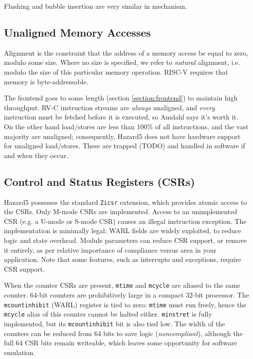 Flushing and bubble insertion are very similar in mechanism.

\subsection{Unaligned Memory Accesses}

Alignment is the constraint that the address of a memory access be equal to zero, modulo some size. Where no size is specified, we refer to {\it natural} alignment, i.e. modulo the size of this particular memory operation. RISC-V requires that memory is byte-addressable.

The frontend goes to some length (section \ref{section:frontend}) to maintain high throughput. RV-C instruction streams are {\it always} unaligned, and {\it every} instruction must be fetched before it is executed, so Amdahl says it's worth it. On the other hand load/stores are less than 100\% of all instructions, and the vast majority are unaligned; consequently, Hazard5 does not have hardware support for unaligned load/stores. These are trapped (TODO) and handled in software if and when they occur.

\subsection{Control and Status Registers (CSRs)}

Hazard5 possesses the standard {\tt Zicsr} extension, which provides atomic access to the CSRs. Only M-mode CSRs are implemented. Access to an unimplemented CSR (e.g. a U-mode or S-mode CSR) causes an illegal instruction exception. The implementation is minimally legal: WARL fields are widely exploited, to reduce logic and state overhead. Module parameters can reduce CSR support, or remove it entirely, as per relative importance of compliance versus area in your application. Note that some features, such as interrupts and exceptions, require CSR support.

When the counter CSRs are present, {\tt mtime} and {\tt mcycle} are aliased to the same counter. 64-bit counters are prohibitively large in a compact 32-bit processor. The {\tt mcountinhibit} (WARL) register is tied to zero: {\tt mtime} must run freely, hence the {\tt mcycle} alias of this counter cannot be halted either. {\tt minstret} is fully implemented, but its {\tt mcountinhibit} bit is also tied low. The width of the counters can be reduced from 64 bits to save logic ({\it noncompliant}), although the full 64 CSR bits remain writeable, which leaves some opportunity for software emulation.

